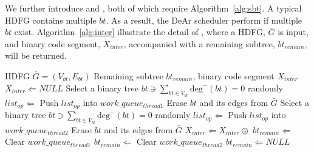 \documentclass[12pt]{article}
\begin{document}
\begin{CJK}{UTF8}{bkai}
        We further introduce  and , 
        both of which require Algorithm~\ref{alg:sbt}.
        A typical HDFG contains multiple $bt$.
        As a result, the DeAr scheduler perform  if multiple $bt$ exist.
        Algorithm~\ref{alg:inter} illustrate the detail of , 
        where a HDFG, $\bar{G}$ is input, and binary code segment, 
        $X_{inter}$, accompanied with a remaining subtree, $bt_{remain}$, will be returned.
\begin{algorithm}[h!]
    \caption{}
    \begin{algorithmic}[1]
        \Require    HDFG $\bar{G} = (V_{bt}, E_{bt})$
        \Ensure     Remaining subtree $bt_{remain}$, binary code segment $X_{inter}$
        \State $X_{inter} \Leftarrow NULL$       
         \label{line:interws}
                \State Select a binary tree $bt \ni \sum_{bt \in V_{bt}}\textrm{deg}^-(bt) = 0$ randomly
                \State $list_{op} \Leftarrow$ 
                \State Push $list_{op}$ into $work\_queue_{thread1}$
                \State Erase $bt$ and its edges from $\bar{G}$
            \EndIf
                \State Select a binary tree $bt \ni \sum_{bt \in V_{bt}}\textrm{deg}^-(bt) = 0$ randomly
                \State $list_{op} \Leftarrow$ 
                \State Push $list_{op}$ into $work\_queue_{thread2}$
                \State Erase $bt$ and its edges from $\bar{G}$
            \EndIf
            \State $X_{inter} \Leftarrow X_{inter} \oplus$  \label{line:intercon}
        \EndWhile \label{line:interwe}
         \label{line:interis}
            \State $bt_{remain} \Leftarrow$ 
            \State Clear $work\_queue_{thread1}$
            \State $bt_{remain} \Leftarrow$ 
            \State Clear $work\_queue_{thread2}$
        \Else
            \State $bt_{remain} \Leftarrow NULL$
        \EndIf \label{line:interie}
        \State {}

\end{algorithmic}
\end{algorithm}
\end{CJK}
\end{document}
